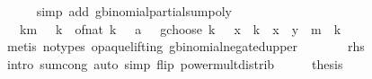 \begin{isabellebody}
\ \ \ \ \isamarkupfalse%
\ {\isacharparenleft}{\kern0pt}simp\ add{\isacharcolon}{\kern0pt}\ gbinomial{\isacharunderscore}{\kern0pt}partial{\isacharunderscore}{\kern0pt}sum{\isacharunderscore}{\kern0pt}poly{\isacharparenright}{\kern0pt}\isanewline
\ \ \isamarkupfalse%
\ \isamarkupfalse%
\ {\isachardoublequoteopen}{\isachardot}{\kern0pt}{\isachardot}{\kern0pt}{\isachardot}{\kern0pt}\ {\isacharequal}{\kern0pt}\ {\isacharparenleft}{\kern0pt}{\isasymSum}k{\isasymle}m{\isachardot}{\kern0pt}\ {\isacharparenleft}{\kern0pt}{\isacharminus}{\kern0pt}{}{\isacharparenright}{\kern0pt}\ {\isacharcircum}{\kern0pt}\ k\ {\isacharasterisk}{\kern0pt}\ {\isacharparenleft}{\kern0pt}of{\isacharunderscore}{\kern0pt}nat\ k\ {\isacharminus}{\kern0pt}\ {\isacharminus}{\kern0pt}\ a\ {\isacharminus}{\kern0pt}\ {}\ gchoose\ k{\isacharparenright}{\kern0pt}\ {\isacharasterisk}{\kern0pt}\ {\isacharparenleft}{\kern0pt}{\isacharminus}{\kern0pt}\ x{\isacharparenright}{\kern0pt}\ {\isacharcircum}{\kern0pt}\ k\ {\isacharasterisk}{\kern0pt}\ {\isacharparenleft}{\kern0pt}x\ {\isacharplus}{\kern0pt}\ y{\isacharparenright}{\kern0pt}\ {\isacharcircum}{\kern0pt}\ {\isacharparenleft}{\kern0pt}m\ {\isacharminus}{\kern0pt}\ k{\isacharparenright}{\kern0pt}{\isacharparenright}{\kern0pt}{\isachardoublequoteclose}\isanewline
\ \ \ \ \isamarkupfalse%
\ {\isacharparenleft}{\kern0pt}metis\ {\isacharparenleft}{\kern0pt}no{\isacharunderscore}{\kern0pt}types{\isacharcomma}{\kern0pt}\ opaque{\isacharunderscore}{\kern0pt}lifting{\isacharparenright}{\kern0pt}\ gbinomial{\isacharunderscore}{\kern0pt}negated{\isacharunderscore}{\kern0pt}upper{\isacharparenright}{\kern0pt}\isanewline
\ \ \isamarkupfalse%
\ \isamarkupfalse%
\ {\isachardoublequoteopen}{\isachardot}{\kern0pt}{\isachardot}{\kern0pt}{\isachardot}{\kern0pt}\ {\isacharequal}{\kern0pt}\ {\isacharquery}{\kern0pt}rhs{\isachardoublequoteclose}\isanewline
\ \ \ \ \isamarkupfalse%
\ {\isacharparenleft}{\kern0pt}intro\ sum{\isachardot}{\kern0pt}cong{\isacharparenright}{\kern0pt}\ {\isacharparenleft}{\kern0pt}auto\ simp\ flip{\isacharcolon}{\kern0pt}\ power{\isacharunderscore}{\kern0pt}mult{\isacharunderscore}{\kern0pt}distrib{\isacharparenright}{\kern0pt}\isanewline
\ \ \isamarkupfalse%
\ \isamarkupfalse%
\ {\isacharquery}{\kern0pt}thesis\ \isacommand{{\isachardot}{\kern0pt}}\isamarkupfalse%
\isanewline
{}\isamarkupfalse%
%
\endisatagproof
{\isafoldproof}%
%
\isadelimproof
\isanewline

\end{isabellebody}
